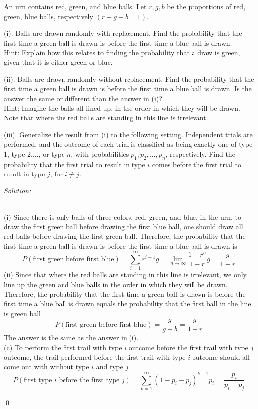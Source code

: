 \documentclass[12pt]{article}
\newenvironment{problem}[2][Problem]{\begin{trivlist}
\item[\hskip \labelsep {\bfseries #1}\hskip \labelsep {\bfseries #2.}]}{\end{trivlist}}
\newenvironment{sol}
    {\emph{Solution:}
    }
    {
    \qed
    }
\begin{document}
\begin{problem}{7}
An urn contains red, green, and blue balls. Let $r, g, b$ be the proportions of red, green, blue balls, respectively
$(r + g + b = 1)$.

(i). Balls are drawn randomly with replacement. Find the probability that the first time a green ball is drawn is before the first time a blue ball is drawn.\\
Hint: Explain how this relates to finding the probability that a draw is green, given that it is either green or blue.

(ii). Balls are drawn randomly without replacement. Find the probability that the first time a green ball is
drawn is before the first time a blue ball is drawn. Is the answer the same or different than the answer
in (i)?\\
Hint: Imagine the balls all lined up, in the order in which they will be drawn. Note that where the red
balls are standing in this line is irrelevant.

(iii). Generalize the result from (i) to the following setting. Independent trials are performed, and the outcome of each trial is classified as being exactly one of type 1, type 2,..., or type $n$, with probabilities $p_1,p_2,...,p_n$, respectively. Find the probability that the first trial to result in type $i$ comes before the first trial to result in type $j$, for $i\neq j$.

\end{problem}
\begin{sol}
\\(i) Since there is only balls of three colors, red, green, and blue, in the urn, to draw the first green ball before drawing the first blue ball, one should draw all red balls before drawing the first green ball. Therefore, the probability that the first time a green ball is drawn is before the first time a blue ball is drawn is
\[
P(\text{first green before first blue})=\sum_{i=1}^{\infty}r^{i-1}g=\lim_{n\to\infty}\frac{1-r^n}{1-r}g=\frac{g}{1-r}
\]
(ii) Since that where the red balls are standing in this line is irrelevant, we only line up the green and blue balls in the order in which they will be drawn. Therefore, the probability that the first time a green ball is drawn is before the first time a blue ball is drawn equals the probability that the first ball in the line is green ball
\[
P(\text{first green before first blue})=\frac{g}{g+b}=\frac{g}{1-r}
\]
The answer is the same as the answer in (i).\\
(c) To perform the first trail with type $i$ outcome before the first trail with type $j$ outcome, the trail performed before the first trail with type $i$ outcome should all come out with without type $i$ and type $j$
\[
P(\text{first type }i\text{ before the first type }j)=\sum_{k=1}^{\infty}(1-p_i-p_j)^{k-1}p_i=\frac{p_i}{p_i+p_j}
\]
\end{sol}
\end{document}
